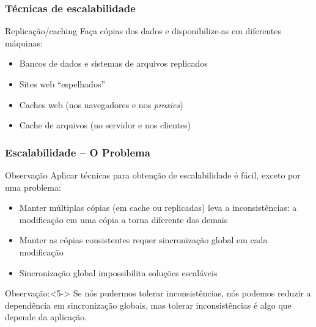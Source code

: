 \documentclass[Ligatures=TeX,table,brazil,svgnames,usetotalslideindicator,compress,10pt]{beamer}
\begin{document}
\begin{frame}
  \frametitle{Técnicas de escalabilidade}

  \begin{block}{Replicação/caching}
    Faça cópias dos dados e disponibilize-as em diferentes máquinas:

    \begin{itemize}
    \item Bancos de dados e sistemas de arquivos replicados
    \item Sites web ``espelhados''
    \item Caches web (nos navegadores e nos \textit{proxies})
    \item Cache de arquivos (no servidor e nos clientes)
    \end{itemize}
  \end{block}

\end{frame}

\begin{frame}
  \frametitle{Escalabilidade -- O Problema}
  \begin{block}{Observação}
    Aplicar técnicas para obtenção de escalabilidade é fácil, exceto por uma problema:

    \begin{itemize}
    \item<2-> Manter múltiplas cópias (em cache ou replicadas) leva a \alert{inconsistências}: a modificação em uma cópia a torna diferente das demais
    \item<3-> Manter as cópias consistentes requer \alert{sincronização global} em cada modificação
    \item<4-> Sincronização global impossibilita soluções escaláveis
    \end{itemize}
  \end{block}

  \begin{block}{Observação:}<5->
    Se nós pudermos tolerar inconsistências, nós podemos reduzir a
    dependência em sincronização globais, mas \alert{tolerar
      inconsistências é algo que depende da aplicação}.
  \end{block}

\end{frame}
\end{document}
